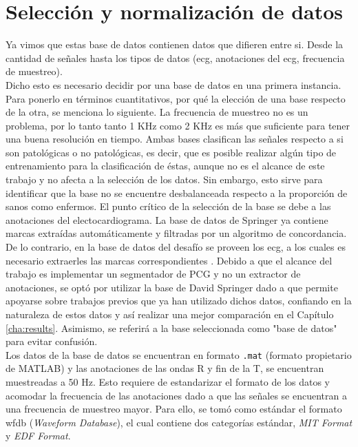 \section{Selección y normalización de datos} \label{sec:data-selection-normalization}

Ya vimos que estas base de datos contienen datos que difieren entre si. Desde la cantidad de señales hasta los tipos
de datos (\acrshort{ecg}, anotaciones del \acrshort{ecg}, frecuencia de muestreo). \\
\indent Dicho esto es necesario decidir por una base de datos en una primera instancia. Para ponerlo en términos
cuantitativos, por qué la elección de una base respecto de la otra, se menciona lo siguiente. La frecuencia de
muestreo no es un problema, por lo tanto tanto 1 KHz como 2 KHz es más que suficiente para tener una buena
resolución en tiempo. Ambas bases clasifican las señales respecto a si son patológicas o no patológicas, es decir,
que es posible realizar algún tipo de entrenamiento para la clasificación de éstas, aunque no es el alcance de este
trabajo y no afecta a la selección de los datos. Sin embargo, esto sirve para identificar que la base no se
encuentre desbalanceada respecto a la proporción de sanos como enfermos. El punto crítico de la selección de la base
se debe a las anotaciones del electocardiograma. La base de datos de Springer \cite{ref:logi-regression-springer} ya
contiene marcas extraídas automáticamente y filtradas por un algoritmo de concordancia. De lo contrario, en la base
de datos del desafío se proveen los \acrshort{ecg}, a los cuales es necesario extraerles las marcas correspondientes
. Debido a que el alcance del trabajo es implementar un segmentador de PCG y no un extractor de anotaciones, se optó
por utilizar la base de David Springer dado a que permite apoyarse sobre trabajos previos que ya han utilizado
dichos datos, confiando en la naturaleza de estos datos y así realizar una mejor comparación en el Capítulo
\ref{cha:results}. Asimismo, se referirá a la base seleccionada como "base de datos" para evitar confusión. \\
\indent Los datos de la base de datos se encuentran en formato \texttt{.mat} (formato propietario de
\textsc{MATLAB\texttrademark}) y las anotaciones de las ondas R y fin de la T, se encuentran muestreadas a 50 Hz.
Esto requiere de estandarizar el formato de los datos y acomodar la frecuencia de las anotaciones dado a que las
señales se encuentran a una frecuencia de muestreo mayor. Para ello, se tomó como estándar el formato
\acrshort{wfdb} (\textit{Waveform Database}), el cual contiene dos categorías estándar, \textit{MIT Format} y
\textit{EDF Format}.

